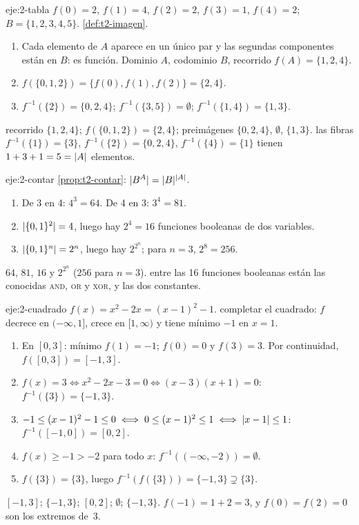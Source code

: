 \begin{solucion}{eje:2-tabla}
\datos $f(0)=2$, $f(1)=4$, $f(2)=2$, $f(3)=1$, $f(4)=2$; $B=\{1,2,3,4,5\}$.
\planteamiento \cref{def:t2-imagen}.
\pasos
\begin{enumerate}[label=\arabic*.]
  \item Cada elemento de $A$ aparece en un único par y las segundas componentes están en $B$: es función. Dominio $A$, codominio $B$, recorrido $f(A)=\{1,2,4\}$.
  \item $f(\{0,1,2\})=\{f(0),f(1),f(2)\}=\{2,4\}$.
  \item $f^{-1}(\{2\})=\{0,2,4\}$; $f^{-1}(\{3,5\})=\emptyset$; $f^{-1}(\{1,4\})=\{1,3\}$.
\end{enumerate}
\resultado recorrido $\{1,2,4\}$; $f(\{0,1,2\})=\{2,4\}$; preimágenes $\{0,2,4\}$, $\emptyset$, $\{1,3\}$.
\comprobacion las fibras $f^{-1}(\{1\})=\{3\}$, $f^{-1}(\{2\})=\{0,2,4\}$, $f^{-1}(\{4\})=\{1\}$ tienen $1+3+1=5=\lvert A\rvert$ elementos.
\end{solucion}

\begin{solucion}{eje:2-contar}
\planteamiento \cref{prop:t2-contar}: $\lvert B^{A}\rvert=\lvert B\rvert^{\lvert A\rvert}$.
\pasos
\begin{enumerate}[label=\arabic*.]
  \item De 3 en 4: $4^{3}=64$. De 4 en 3: $3^{4}=81$.
  \item $\lvert\{0,1\}^{2}\rvert=4$, luego hay $2^{4}=16$ funciones booleanas de dos variables.
  \item $\lvert\{0,1\}^{n}\rvert=2^{n}$, luego hay $2^{2^{n}}$; para $n=3$, $2^{8}=256$.
\end{enumerate}
\resultado $64$, $81$, $16$ y $2^{2^{n}}$ ($256$ para $n=3$).
\comprobacion entre las 16 funciones booleanas están las conocidas \textsc{and}, \textsc{or} y \textsc{xor}, y las dos constantes.
\end{solucion}

\begin{solucion}{eje:2-cuadrado}
\datos $f(x)=x^{2}-2x=(x-1)^{2}-1$.
\planteamiento completar el cuadrado: $f$ decrece en $(-\infty,1]$, crece en $[1,\infty)$ y tiene mínimo $-1$ en $x=1$.
\pasos
\begin{enumerate}[label=\arabic*.]
  \item En $[0,3]$: mínimo $f(1)=-1$; $f(0)=0$ y $f(3)=3$. Por continuidad, $f([0,3])=[-1,3]$.
  \item $f(x)=3\iff x^{2}-2x-3=0\iff(x-3)(x+1)=0$: $f^{-1}(\{3\})=\{-1,3\}$.
  \item $-1\le(x-1)^{2}-1\le0\iff0\le(x-1)^{2}\le1\iff\lvert x-1\rvert\le1$: $f^{-1}([-1,0])=[0,2]$.
  \item $f(x)\ge-1>-2$ para todo $x$: $f^{-1}((-\infty,-2))=\emptyset$.
  \item $f(\{3\})=\{3\}$, luego $f^{-1}(f(\{3\}))=\{-1,3\}\supsetneq\{3\}$.
\end{enumerate}
\resultado $[-1,3]$; $\{-1,3\}$; $[0,2]$; $\emptyset$; $\{-1,3\}$.
\comprobacion $f(-1)=1+2=3$, y $f(0)=f(2)=0$ son los extremos de~3.
\end{solucion}

